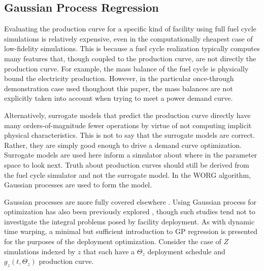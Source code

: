 \subsection{Gaussian Process Regression}
\label{gp}

Evaluating the production curve for a specific kind of facility using
full fuel cycle simulations is relatively expensive, even in the
computationally cheapest case of low-fidelity simulations. This is because a
fuel cycle realization
typically computes many features that, though coupled to the production
curve, are not directly the production curve. For example, the mass balance of
the fuel cycle is physically bound the electricity production. However,
in the particular once-through demonstration case used thoughout this paper,
the mass balances are not explicitly taken into account when trying to meet
a power demand curve.

Alternatively, surrogate models that predict the production curve directly
have many orders-of-magnitude fewer operations by virtue of not computing
implicit physical characteristics. This is not to say that the surrogate
models are correct.  Rather, they are simply good enough to drive a demand
curve
optimization. Surrogate models are used here inform a simulator about where
in the parameter space to look next. Truth about production curves should
still be derived from the fuel cycle simulator and not the surrogate model.
In the WORG algorithm, Gaussian processes are used to form the model.

Gaussian processes are more fully covered elsewhere
\cite{rasmussen2006gaussian}. Using Gaussian process for optimization has
also been previously explored \cite{osborne2009gaussian}, though such studies
tend not to
investigate the integral problems posed by facility deployment. As with
dynamic time warping, a minimal but sufficient introduction to GP regression
is presented
for the purposes of the deployment optimization.
Consider the case of $Z$ simulations indexed by $z$ that each have a
$\Theta_z$ deployment schedule and $g_z(t, \Theta_z)$ production curve.

